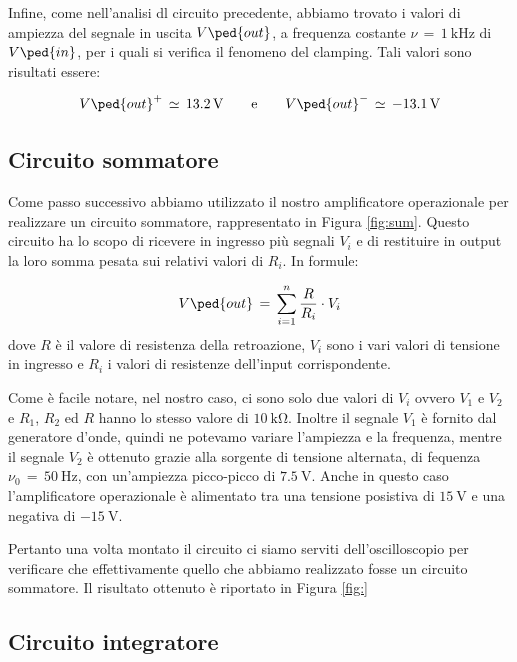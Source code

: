Infine, come nell'analisi dl circuito precedente, abbiamo trovato i valori di ampiezza del segnale in uscita $V\ped{out}$, a frequenza costante $\nu\,=\,\SI{1}{\kilo\hertz}$ di $V\ped{in}$, per i quali si verifica il fenomeno del clamping. Tali valori sono risultati essere:

\begin{equation}
        V\ped{out}^+\,\simeq\,\SI{13.2}{\volt} \qquad \text{e} \qquad V\ped{out}^-\,\simeq\,\SI{-13.1}{\volt}
\end{equation}

\subsection*{Circuito sommatore}

Come passo successivo abbiamo utilizzato il nostro amplificatore operazionale per realizzare un circuito sommatore, rappresentato in Figura \ref{fig:sum}. Questo circuito ha lo scopo di ricevere in ingresso più segnali $V_i$ e di restituire in output la loro somma pesata sui relativi valori di $R_i$. In formule:

\begin{equation}
        V\ped{out}\,=\,\sum_{i=1}^{n}{\frac{R}{R_i} \cdot V_i}
\end{equation}
%
dove $R$ è il valore di resistenza della retroazione, $V_i$ sono i vari valori di tensione in ingresso e $R_i$ i valori di resistenze dell'input corrispondente.

Come è facile notare, nel nostro caso, ci sono solo due valori di $V_i$ ovvero $V_1$ e $V_2$ e $R_1$, $R_2$ ed $R$ hanno lo stesso valore di $\SI{10}{\kilo\ohm}$. Inoltre il segnale $V_1$ è fornito dal generatore d'onde, quindi ne potevamo variare l'ampiezza e la frequenza, mentre il segnale $V_2$ è ottenuto grazie alla sorgente di tensione alternata, di fequenza $\nu_0\,=\,\SI{50}{\hertz}$, con un'ampiezza picco-picco di $\SI{7.5}{\volt}$. Anche in questo caso l'amplificatore operazionale è alimentato tra una tensione posistiva di $\SI{+15}{\volt}$ e una negativa di $\SI{-15}{\volt}$.

Pertanto una volta montato il circuito ci siamo serviti dell'oscilloscopio per verificare che effettivamente quello che abbiamo realizzato fosse un circuito sommatore. Il risultato ottenuto è riportato in Figura \ref{fig:}

\subsection*{Circuito integratore}

